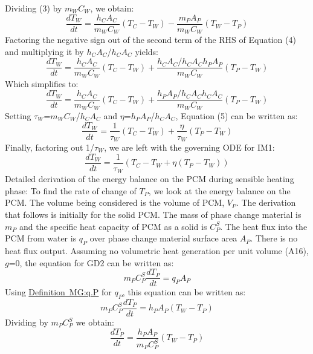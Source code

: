 \documentclass[12pt]{article}
\begin{document}
Dividing (3) by $m_{W}$$C_{W}$, we obtain:
\begin{equation}
\frac{dT_{W}}{dt}=\frac{h_{C}A_{C}}{m_{W}C_{W}}(T_{C}-T_{W})-\frac{m_{P}A_{P}}{m_{W}C_{W}}(T_{W}-T_{P})
\end{equation}
Factoring the negative sign out of the second term of the RHS of Equation (4) and multiplying it by $h_{C}$$A_{C}$/$h_{C}$$A_{C}$ yields:
\begin{equation}
\frac{dT_{W}}{dt}=\frac{h_{C}A_{C}}{m_{W}C_{W}}(T_{C}-T_{W})+\frac{h_{C}A_{C}/h_{C}A_{C}h_{P}A_{P}}{m_{W}C_{W}}(T_{P}-T_{W})
\end{equation}
Which simplifies to:
\begin{equation}
\frac{dT_{W}}{dt}=\frac{h_{C}A_{C}}{m_{W}C_{W}}(T_{C}-T_{W})+\frac{h_{P}A_{P}/h_{C}A_{C}h_{C}A_{C}}{m_{W}C_{W}}(T_{P}-T_{W})
\end{equation}
Setting $\tau{}_{W}$=$m_{W}$$C_{W}$/$h_{C}$$A_{C}$ and $\eta{}$=$h_{P}$$A_{P}$/$h_{C}$$A_{C}$, Equation (5) can be written as:
\begin{equation}
\frac{dT_{W}}{dt}=\frac{1}{\tau{}_{W}}(T_{C}-T_{W})+\frac{\eta{}}{\tau{}_{W}}(T_{P}-T_{W})
\end{equation}
Finally, factoring out 1/$\tau{}_{W}$, we are left with the governing ODE for IM1:
\begin{equation}
\frac{dT_{W}}{dt}=\frac{1}{\tau{}_{W}}(T_{C}-T_{W}+\eta{}(T_{P}-T_{W}))
\end{equation}
Detailed derivation of the energy balance on the PCM during sensible heating phase:
To find the rate of change of $T_{P}$, we look at the energy balance on the PCM. The volume being considered is the volume of PCM, $V_{P}$. The derivation that follows is initially for the solid PCM. The mass of phase change material is $m_{P}$ and the specific heat capacity of PCM as a solid is $C_{P}^{S}$. The heat flux into the PCM from water is $q_{P}$ over phase change material surface area $A_{P}$. There is no heat flux output. Assuming no volumetric heat generation per unit volume (A16), $g$=0, the equation for GD2 can be written as:
\begin{equation}
m_{P}C_{P}^{S}\frac{dT_{P}}{dt}=q_{P}A_{P}
\end{equation}
Using \hyperref[MG:q.P]{Definition~MG:q.P} for $q_{P}$, this equation can be written as:
\begin{equation}
m_{P}C_{P}^{S}\frac{dT_{P}}{dt}=h_{P}A_{P}(T_{W}-T_{P})
\end{equation}
Dividing by $m_{P}$$C_{P}^{S}$ we obtain:
\begin{equation}
\frac{dT_{P}}{dt}=\frac{h_{P}A_{P}}{m_{P}C_{P}^{S}}(T_{W}-T_{P})
\end{equation}
\end{document}
